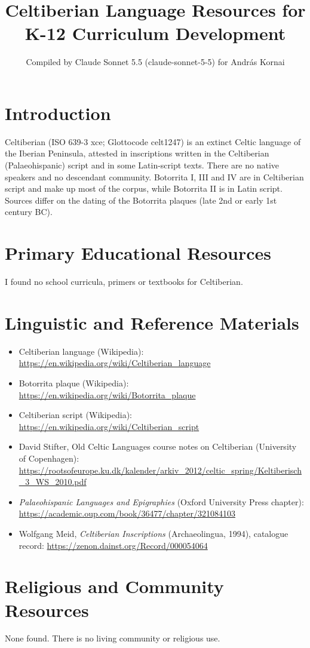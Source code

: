 \documentclass[12pt]{article}
\title{Celtiberian Language Resources for K-12 Curriculum Development}
\author{Compiled by Claude Sonnet 5.5 (claude-sonnet-5-5) for Andr\'as Kornai}
\date{}
\begin{document}
\maketitle

\section{Introduction}
Celtiberian (ISO 639-3 xce; Glottocode celt1247) is an extinct Celtic language of the Iberian Peninsula, attested in inscriptions written in the Celtiberian (Palaeohispanic) script and in some Latin-script texts. There are no native speakers and no descendant community. Botorrita I, III and IV are in Celtiberian script and make up most of the corpus, while Botorrita II is in Latin script. Sources differ on the dating of the Botorrita plaques (late 2nd or early 1st century BC).

\section{Primary Educational Resources}
I found no school curricula, primers or textbooks for Celtiberian.

\section{Linguistic and Reference Materials}
\begin{itemize}
\item Celtiberian language (Wikipedia): \url{https://en.wikipedia.org/wiki/Celtiberian_language}
\item Botorrita plaque (Wikipedia): \url{https://en.wikipedia.org/wiki/Botorrita_plaque}
\item Celtiberian script (Wikipedia): \url{https://en.wikipedia.org/wiki/Celtiberian_script}
\item David Stifter, Old Celtic Languages course notes on Celtiberian (University of Copenhagen): \url{https://rootsofeurope.ku.dk/kalender/arkiv_2012/celtic_spring/Keltiberisch_3_WS_2010.pdf}
\item \emph{Palaeohispanic Languages and Epigraphies} (Oxford University Press chapter): \url{https://academic.oup.com/book/36477/chapter/321084103}
\item Wolfgang Meid, \emph{Celtiberian Inscriptions} (Archaeolingua, 1994), catalogue record: \url{https://zenon.dainst.org/Record/000054064}
\end{itemize}

\section{Religious and Community Resources}
None found. There is no living community or religious use.
\end{document}
